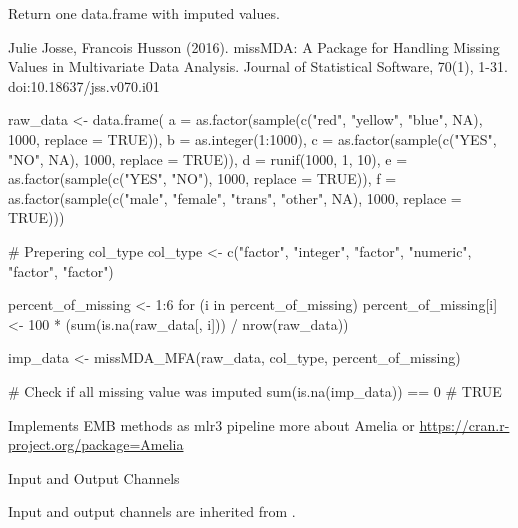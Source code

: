 \documentclass[letterpaper]{book}
\begin{document}
%
\begin{Value}
Return one data.frame with imputed values.
\end{Value}
%
\begin{References}\relax
Julie Josse, Francois Husson (2016). missMDA: A Package for Handling Missing Values in Multivariate Data Analysis. Journal of Statistical Software, 70(1), 1-31. doi:10.18637/jss.v070.i01
\end{References}
%
\begin{Examples}
\begin{ExampleCode}
{
  raw_data <- data.frame(
    a = as.factor(sample(c("red", "yellow", "blue", NA), 1000, replace = TRUE)),
    b = as.integer(1:1000),
    c = as.factor(sample(c("YES", "NO", NA), 1000, replace = TRUE)),
    d = runif(1000, 1, 10),
    e = as.factor(sample(c("YES", "NO"), 1000, replace = TRUE)),
    f = as.factor(sample(c("male", "female", "trans", "other", NA), 1000, replace = TRUE)))

  # Prepering col_type
  col_type <- c("factor", "integer", "factor", "numeric", "factor", "factor")

  percent_of_missing <- 1:6
  for (i in percent_of_missing) {
    percent_of_missing[i] <- 100 * (sum(is.na(raw_data[, i])) / nrow(raw_data))
  }


  imp_data <- missMDA_MFA(raw_data, col_type, percent_of_missing)

  # Check if all missing value was imputed
  sum(is.na(imp_data)) == 0
  # TRUE
}
\end{ExampleCode}
\end{Examples}
%
\begin{Description}\relax
Implements EMB methods as mlr3 pipeline more about Amelia  or \url{https://cran.r-project.org/package=Amelia}
\end{Description}
%
\begin{Section}{Input and Output Channels}

Input and output channels are inherited from .
\end{Section}
%
\end{document}
